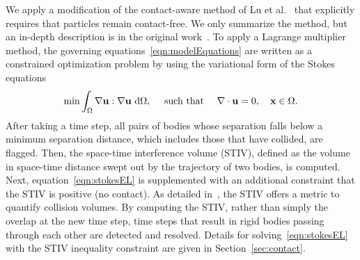 \documentclass[AMA,STIX1COL]{WileyNJD-v2}
\begin{document}
We apply a modification of the contact-aware method of Lu et
al.~\cite{Lu2017} that explicitly requires that particles remain
contact-free. We only summarize the method, but an in-depth description
is in the original work~\cite{Lu2017}.  To apply a Lagrange multiplier
method, the governing equations~\eqref{eqn:modelEquations} are written
as a constrained optimization problem by using the variational form of
the Stokes equations
\begin{align}
  \min \int_{\Omega} \nabla{\mathbf{u}}:\nabla{\mathbf{u}}~\text{d}\Omega,
  \quad\text{ such that }\quad \nabla\cdot{\mathbf{u}} = 0, 
  \quad {\mathbf{x}} \in \Omega.
  \label{eqn:stokesEL}
\end{align} 
After taking a time step, all pairs of bodies whose separation falls
below a minimum separation distance, which includes those that have
collided, are flagged.  Then, the space-time interference volume (STIV),
defined as the volume in space-time distance swept out by the trajectory
of two bodies, is computed.  Next, equation~\eqref{eqn:stokesEL} is
supplemented with an additional constraint that the STIV is positive (no
contact).  As detailed in~\cite{Lu2017, Harmon2011}, the STIV offers a
metric to quantify collision volumes.  By computing the STIV, rather
than simply the overlap at the new time step, time steps that result in
rigid bodies passing through each other are detected and resolved.
Details for solving~\eqref{eqn:stokesEL} with the STIV inequality
constraint are given in Section~\ref{sec:contact}.
\end{document}
